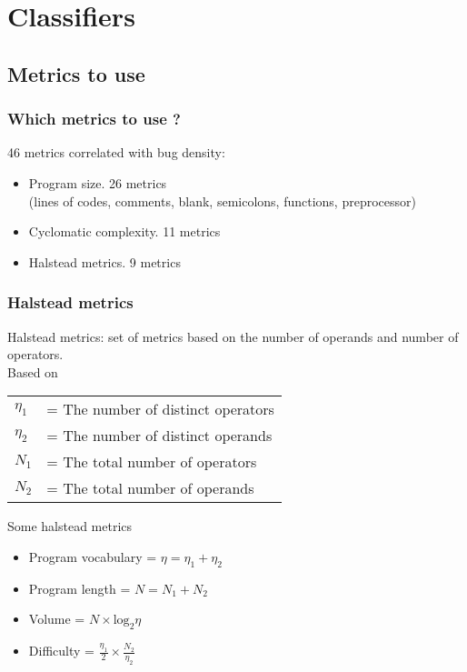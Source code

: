 \section{Classifiers}

\subsection{Metrics to use}
\begin{frame}
 \frametitle{Which metrics to use ?}
 46 metrics correlated with bug density:
 \begin{itemize}
  \item Program size. 26 metrics\\
  (lines of codes, comments, blank, semicolons, functions, preprocessor)
  \item Cyclomatic complexity. 11 metrics
  \item Halstead metrics. 9 metrics
 \end{itemize}
\end{frame}

\begin{frame}
 \frametitle{Halstead metrics}
 Halstead metrics: set of metrics based on the number of operands and number of operators.\\
 Based on
 \begin{center}
  \begin{tabular}{ll}
   $\eta_1$ & = The number of distinct operators\\
   $\eta_2$ & = The number of distinct operands\\
   $N_1$ & = The total number of operators\\
   $N_2$ & = The total number of operands\\
  \end{tabular}
 \end{center}
 \begin{exampleblock}{Some halstead metrics}
  \begin{itemize}
   \item Program vocabulary = $\eta = \eta_1 + \eta_2$
   \item Program length = $N = N_1 + N_2$
   \item Volume = $N \times \text{log}_2\eta$
   \item Difficulty = $\frac{\eta_1}{2} \times \frac{N_2}{\eta_2}$
  \end{itemize}
 \end{exampleblock}
\end{frame}

